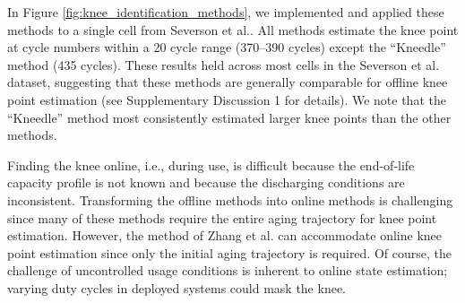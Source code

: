 \documentclass[journal=jpcl, manuscript=article, layout=onecolumn]{achemso}
\newcommand{\cmark}{\textcolor{blue}{\textrm{\ding{52}}}}%
\newcommand{\gbox}[1]{{
\fbox{
\parbox{0.8\textwidth}{  \fbox{$\triangleright$\textcolor{blue}{\textbf{Gon}:}} 
#1
}}}}
\begin{document}
In Figure \ref{fig:knee_identification_methods}, we implemented and applied these methods to a single cell from Severson et al.\cite{severson_data-driven_2019}. All methods estimate the knee point at cycle numbers within a 20 cycle range (370--390 cycles) except the ``Kneedle'' method (435 cycles). These results held across most cells in the Severson et al.\cite{severson_data-driven_2019} dataset, suggesting that these methods are generally comparable for offline knee point estimation (see Supplementary Discussion 1 for details). We note that the ``Kneedle'' method most consistently estimated larger knee points than the other methods.

Finding the knee online, i.e., during use, is difficult because the end-of-life capacity profile is not known and because the discharging conditions are inconsistent. Transforming the offline methods into online methods is challenging since many of these methods require the entire aging trajectory for knee point estimation. However, the method of Zhang et al.\cite{zhang_accelerated_2019} can accommodate online knee point estimation since only the initial aging trajectory is required. Of course, the challenge of uncontrolled usage conditions is inherent to online state estimation; varying duty cycles in deployed systems could mask the knee.



    
        
\end{document}
